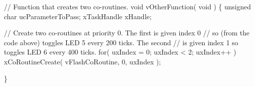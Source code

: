 \begin{DoxyPre}// Function that creates two co-routines.
void vOtherFunction( void )
\{
unsigned char ucParameterToPass;
xTaskHandle xHandle;
\begin{DoxyVerb}// Create two co-routines at priority 0.  The first is given index 0
// so (from the code above) toggles LED 5 every 200 ticks.  The second
// is given index 1 so toggles LED 6 every 400 ticks.
for( uxIndex = 0; uxIndex < 2; uxIndex++ )
{
    xCoRoutineCreate( vFlashCoRoutine, 0, uxIndex );
}
\end{DoxyVerb}

\}
  \end{DoxyPre}
 